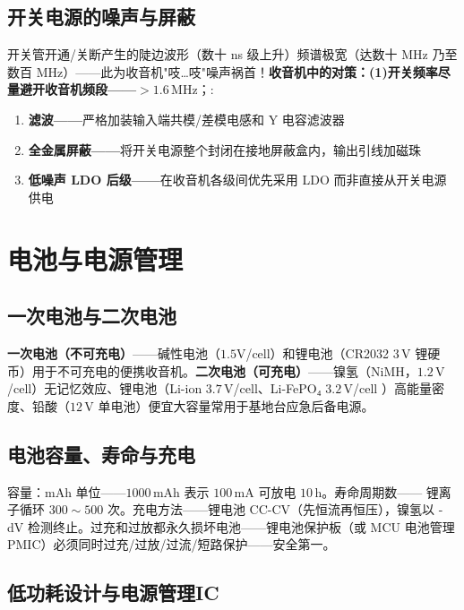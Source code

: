 \documentclass[12pt,UTF8]{ctexbook}
\begin{document}
\subsection{开关电源的噪声与屏蔽}

开关管开通/关断产生的陡边波形（数十 ns 级上升）频谱极宽（达数十 MHz 乃至数百 MHz）——此为收音机"吱…吱"噪声祸首！\textbf{收音机中的对策：(1)}\textbf{开关频率尽量避开收音机频段——}$>1.6\,\mathrm{MHz}$；:
\begin{enumerate}
\item \textbf{滤波——}严格加装输入端共模/差模电感和 Y 电容滤波器
\item \textbf{全金属屏蔽——}将开关电源整个封闭在接地屏蔽盒内，输出引线加磁珠
\item \textbf{低噪声 LDO 后级——}在收音机各级间优先采用 LDO 而非直接从开关电源供电
\end{enumerate}

\section{电池与电源管理}
\label{sec:battery_power_mgmt}

\subsection{一次电池与二次电池}

\textbf{一次电池（不可充电）}——碱性电池（$1.5\mathrm{V}$/cell）和锂电池（CR2032 $3\,\mathrm{V}$ 锂硬币）用于不可充电的便携收音机。\textbf{二次电池（可充电）}——镍氢（NiMH，$1.2\,\mathrm{V}$/cell）无记忆效应、锂电池（Li-ion $3.7\,\mathrm{V}$/cell、Li-FePO₄ $3.2\,\mathrm{V}$/cell ）高能量密度、铅酸（$12\,\mathrm{V}$ 单电池）便宜大容量常用于基地台应急后备电源。

\subsection{电池容量、寿命与充电}

容量：mAh 单位——$1000\,\mathrm{mAh}$ 表示 $100\,\mathrm{mA}$ 可放电 $10\,\mathrm{h}$。寿命周期数—— 锂离子循环 $300\sim500$ 次。充电方法——锂电池 CC-CV（先恒流再恒压），镍氢以 -dV 检测终止。过充和过放都永久损坏电池——锂电池保护板（或 MCU 电池管理 PMIC）必须同时过充/过放/过流/短路保护——安全第一。

\subsection{低功耗设计与电源管理IC}
\end{document}
